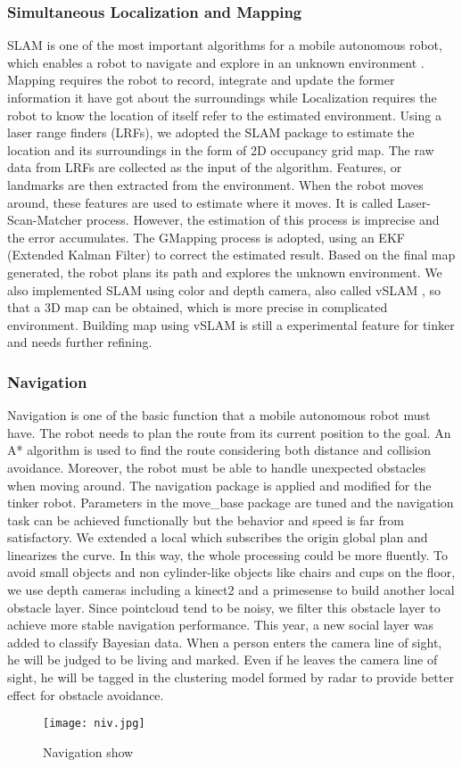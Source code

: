 \subsubsection{Simultaneous Localization and Mapping}
SLAM is one of the most important algorithms for a mobile autonomous robot, which enables a robot to navigate and explore in an unknown environment \cite{grisetti2007improved}. Mapping requires the robot to record, integrate and update the former information it have got about the surroundings while Localization requires the robot to know the location of itself refer to the estimated environment. Using a laser range finders (LRFs), we adopted the SLAM package to estimate the location and its surroundings in the form of 2D occupancy grid map. The raw data from LRFs are collected as the input of the algorithm. Features, or landmarks are then extracted from the environment. When the robot moves around, these features are used to estimate where it moves. It is called Laser-Scan-Matcher process. However, the estimation of this process is imprecise and the error accumulates. The GMapping process is adopted, using an EKF (Extended Kalman Filter) to correct the estimated result. Based on the final map generated, the robot plans its path and explores the unknown environment.
We also implemented SLAM using color and depth camera, also called vSLAM \cite{se2005vision}, so that a 3D map can be obtained, which is more precise in complicated environment. Building map using vSLAM is still a experimental feature for tinker and needs further refining.
\subsubsection{Navigation}
Navigation is one of the basic function that a mobile autonomous robot must have. The robot needs to plan the route from its current position to the goal. An A* algorithm is used to find the route considering both distance and  collision avoidance. Moreover, the robot must be able to handle unexpected obstacles when moving around. The navigation package is applied and modified for the tinker robot. Parameters in the move\_base package are tuned and the navigation task can be achieved functionally but the behavior and speed is far from satisfactory. We extended a local  which subscribes the origin global plan and linearizes the curve. In this way, the whole processing could be more fluently. 
To avoid small objects and non cylinder-like objects like chairs and cups on the floor, we use depth cameras including a kinect2 and a primesense to build another local obstacle layer. Since pointcloud tend to be noisy, we filter this obstacle layer to achieve more stable navigation performance.
This year, a new social layer was added to classify Bayesian data. When a person enters the camera line of sight, he will be judged to be living and marked. Even if he leaves the camera line of sight, he will be tagged in the clustering model formed by radar to provide better effect for obstacle avoidance. 

\begin{figure*}[!t]
	\centering
	\texttt{[image: niv.jpg]}
	\caption{Navigation show}
\end{figure*}
